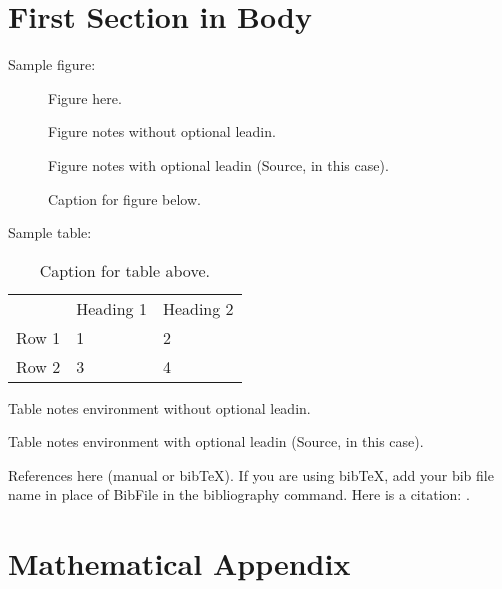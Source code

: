 \documentclass[JEL,
finalmode,  %
]{AEA}
\begin{document}
\section{First Section in Body}

Sample figure:

\begin{figure}
    Figure here.
    
    \caption{Caption for figure below.}
    \begin{figurenotes}
        Figure notes without optional leadin.
    \end{figurenotes}
    \begin{figurenotes}[Source]
        Figure notes with optional leadin (Source, in this case).
    \end{figurenotes}
\end{figure}

Sample table:

\begin{table}
    \caption{Caption for table above.}
    
    \begin{tabular}{lll}
              & Heading 1 & Heading 2 \\ 
        Row 1 & 1         & 2         \\ 
        Row 2 & 3         & 4         %
    \end{tabular}
    \begin{tablenotes}
        Table notes environment without optional leadin.
    \end{tablenotes}
    \begin{tablenotes}[Source]
        Table notes environment with optional leadin (Source, in this case).
    \end{tablenotes}
\end{table}

References here (manual or bibTeX). If you are using bibTeX, add your bib file 
name in place of BibFile in the bibliography command. Here is a citation: \cite{Lehe2024}.



\appendix

\section{Mathematical Appendix}
\end{document}
